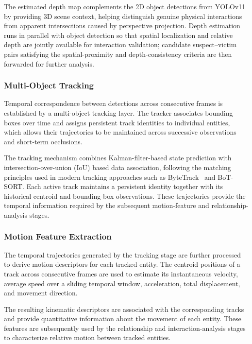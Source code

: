 \documentclass[runningheads]{llncs}
\begin{document}
The estimated depth map complements the 2D object detections from
YOLOv11 by providing 3D scene context, helping distinguish genuine
physical interactions from apparent intersections caused by perspective
projection. Depth estimation runs in parallel with object detection so
that spatial localization and relative depth are jointly available for
interaction validation; candidate suspect--victim pairs satisfying the
spatial-proximity and depth-consistency criteria are then forwarded for
further analysis.
\subsubsection{Multi-Object Tracking}

Temporal correspondence between detections across consecutive
frames is established by a multi-object tracking layer. The tracker
associates bounding boxes over time and assigns persistent track identities
to individual entities, which allows their trajectories to be maintained across
successive observations and short-term occlusions.

The tracking mechanism combines Kalman-filter-based state prediction with
intersection-over-union (IoU) based data association, following the matching
principles used in modern tracking approaches such as ByteTrack~\cite{bytetrack} and
BoT-SORT. Each active track maintains a persistent identity together with
its historical centroid and bounding-box observations. These trajectories
provide the temporal information required by the subsequent motion-feature
and relationship-analysis stages.

\subsubsection{Motion Feature Extraction}

The temporal trajectories generated by the tracking stage are further
processed to derive motion descriptors for each tracked entity. The
centroid positions of a track across consecutive frames are used to
estimate its instantaneous velocity, average speed over a sliding temporal
window, acceleration, total displacement, and movement direction.

The resulting kinematic descriptors are associated with the corresponding
tracks and provide quantitative information about the movement of each
entity. These features are subsequently used by the relationship and
interaction-analysis stages to characterize relative motion between
tracked entities.
\end{document}
